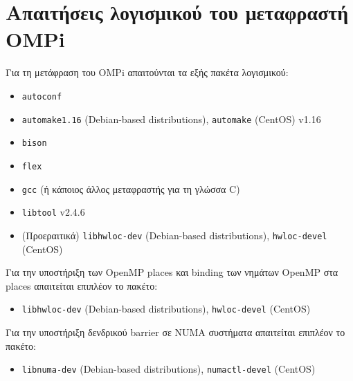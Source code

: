 \chapter{Απαιτήσεις λογισμικού του μεταφραστή OMPi}
\label{app:OMPi's software requirements}

Για τη μετάφραση του OMPi απαιτούνται τα εξής πακέτα λογισμικού:

\begin{itemize}
	\item \texttt{autoconf}
	\item \texttt{automake1.16} (Debian-based distributions), \texttt{automake} (CentOS) v1.16
	\item \texttt{bison}
	\item \texttt{flex}
	\item \texttt{gcc} (ή κάποιος άλλος μεταφραστής για τη γλώσσα C)
	\item \texttt{libtool} v2.4.6
	\item (Προεραιτικά) \texttt{libhwloc-dev} (Debian-based distributions), \texttt{hwloc-devel} (CentOS)
\end{itemize}

\noindent  Για την υποστήριξη των OpenMP places και binding των νημάτων OpenMP στα places απαιτείται επιπλέον το πακέτο:

\begin{itemize}
	\item \texttt{libhwloc-dev} (Debian-based distributions), \texttt{hwloc-devel} (CentOS)
\end{itemize}

\noindent Για την υποστήριξη δενδρικού barrier σε NUMA συστήματα απαιτείται επιπλέον το πακέτο:

\begin{itemize}
	\item \texttt{libnuma-dev} (Debian-based distributions), \texttt{numactl-devel} (CentOS)
\end{itemize}